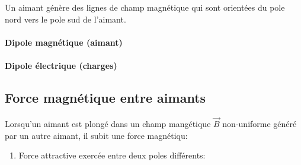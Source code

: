 \documentclass[
    11pt,
    a4paper,
    oneside,
    headinlcude, footinclude,
    twoside,
]{report}
\renewcommand{\vec}[1]{\overrightarrow{#1}}
\begin{document}
Un aimant génère des lignes de champ magnétique qui sont orientées du pole
nord vers le pole sud de l'aimant.

\begin{center}
    \begin{minipage}{.4\linewidth}
        \paragraph{Dipole magnétique (aimant)}
        \label{par:dipole_magnetique_aimant_}
    \end{minipage}
    \hspace{.09\linewidth}
    \begin{minipage}{.4\linewidth}
        \paragraph{Dipole électrique  (charges)}
    \end{minipage}
\end{center}


\subsection{Force magnétique entre aimants}
\label{sub:force_magnetique_entre_aimants}

Lorsqu'un aimant est plongé dans un champ mangétique $\vec B$ non-uniforme
généré par un autre aimant, il subit une force magnétiqu:

\begin{enumerate}
    \item Force attractive exercée entre deux poles différents:


        \begin{center}
            \begin{minipage}{.5\linewidth}
                \resizebox{\textwidth}{!}{
                    
                }
            \end{minipage}
            \begin{minipage}{.49\linewidth}
                \setlength{\parskip}{.3em}
            \end{minipage}
        \end{center}
\end{enumerate}
\end{document}
